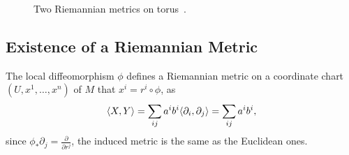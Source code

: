\begin{figure}[htp]
    \centering
    \caption{Two Riemannian metrics on torus~\cite[p.~6]{tuDifferentialGeometry2017}.}
\end{figure}
\subsection{Existence of a Riemannian Metric}
The local diffeomorphism $\phi$ defines a Riemannian metric on 
a coordinate chart $(U, x^1,\dots, x^n)$ of $M$ that $x^i=r^i \circ \phi$, 
as
\begin{equation}
    \langle X, Y \rangle=\sum_{ij}a^i b^i\langle \partial_i, \partial_j \rangle
    =\sum_{ij}a^i b^i,
    \label{eq. induced inner}
\end{equation}
since $\phi_* \partial_j=\frac{\partial}{\partial r^j}$, the induced metric 
is the same as the Euclidean ones.

